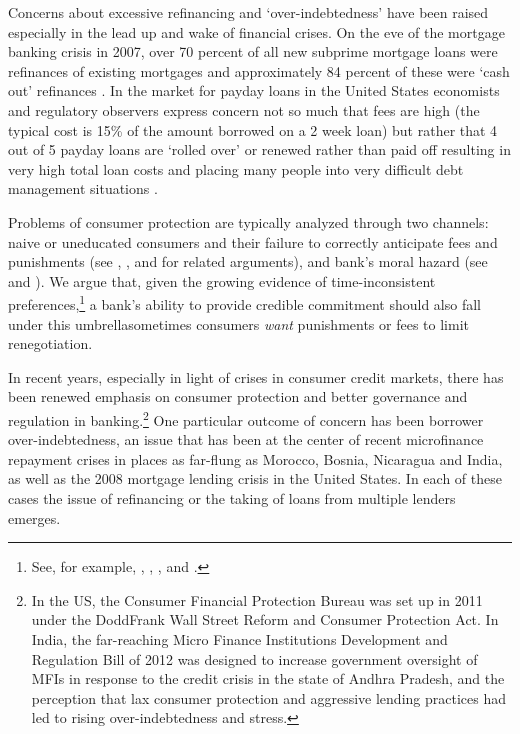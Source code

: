 \documentclass[11pt,english]{article}
\theoremstyle{plain}
\theoremstyle{definition}
\begin{document}
Concerns about excessive refinancing and `over-indebtedness' have
been raised especially in the lead up and wake of financial crises. On the eve of the mortgage banking crisis
in 2007, over 70 percent of all new subprime mortgage loans were refinances
of existing mortgages and approximately 84 percent of these were `cash
out' refinances \citep{demyanyk2011}. In the market
for payday loans in the United States economists and regulatory observers
express concern not so much that fees are high (the typical cost is 15\% of the amount borrowed on a 2 week loan)
but rather that 4 out of 5 payday loans are `rolled over' or renewed
rather than paid off  resulting in very
high total loan costs and placing many people into very difficult
debt management situations \citep{deyoung2015}.

Problems of consumer protection are typically analyzed through two
channels: naive or uneducated consumers and their failure to correctly
anticipate fees and punishments (see \citet{gabaix_shrouded_2006},
\citet{armstrong2012}, and \citet{akerlof2015}
for related arguments), and bank's moral hazard (see \citet{dewatripont1999}
and \citet{oak2010}). We argue that, given the growing evidence
of time-inconsistent preferences,\footnote{See, for example, \citet{laibson2003}, \citet{ashraf_tying_2006},
\citet{gugerty2007}, and \citet{tanaka2010}.} a bank's ability to provide credible commitment should also fall
under this umbrella\textendash sometimes consumers \textit{want} punishments
or fees to limit renegotiation.

In recent years, especially in light of crises in consumer credit
markets, there has been renewed emphasis on consumer protection and
better governance and regulation in banking.\footnote{In the US, the Consumer Financial Protection Bureau was set up in
2011 under the Dodd\textendash Frank Wall Street Reform and Consumer
Protection Act. In India, the far-reaching Micro Finance Institutions
Development and Regulation Bill of 2012 was designed to increase government
oversight of MFIs in response to the credit crisis in the state of
Andhra Pradesh, and the perception that lax consumer protection and
aggressive lending practices had led to rising over-indebtedness and
stress.} One particular outcome of concern has been borrower over-indebtedness,
an issue that has been at the center of recent microfinance repayment
crises in places as far-flung as Morocco, Bosnia, Nicaragua and India,
as well as the 2008 mortgage lending crisis in the United States.
In each of these cases the issue of refinancing or the taking of loans
from multiple lenders emerges.
\end{document}

